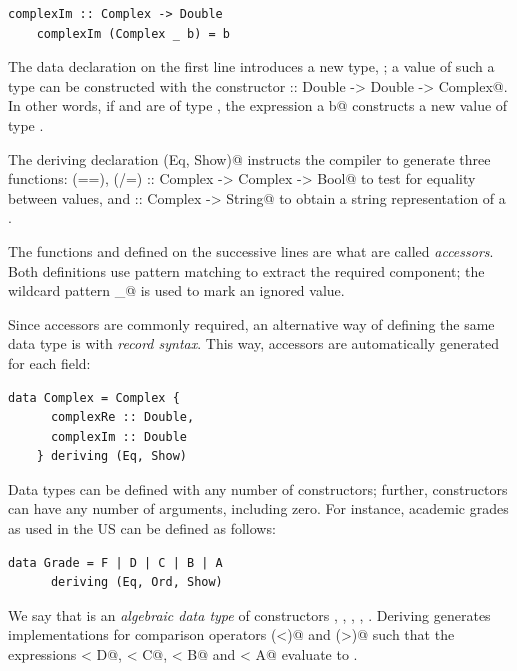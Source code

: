 \documentclass[UdineBachThesis,american,11pt,draft]{PhdThesis}
\begin{document}
  \begin{lstlisting}[gobble=4,basicstyle=\ttfamily\small]
    complexIm :: Complex -> Double
    complexIm (Complex _ b) = b
  \end{lstlisting}

  The data declaration on the first line introduces a new type,
  \lstinline@Complex@; a value of such a type can be constructed with the
  constructor \lstinline@Complex :: Double -> Double -> Complex@. In other
  words, if \lstinline@a@ and \lstinline@b@ are of type \lstinline@Double@, the
  expression \lstinline@Complex a b@ constructs a new value of type
  \lstinline@Complex@.

  The deriving declaration \lstinline@deriving (Eq, Show)@ instructs the
  compiler to generate three functions:
  \lstinline@(==), (/=) :: Complex -> Complex -> Bool@ to test for equality
  between values, and \lstinline@show :: Complex -> String@ to obtain a string
  representation of a \lstinline@Complex@.

  The functions \lstinline@complexRe@ and \lstinline@complexIm@ defined on the
  successive lines are what are called \emph{accessors}. Both definitions use
  pattern matching to extract the required component; the wildcard pattern
  \lstinline@_@ is used to mark an ignored value.

  Since accessors are commonly required, an alternative way of defining the same
  data type is with \emph{record syntax}. This way, accessors are automatically
  generated for each field:

  \begin{lstlisting}[gobble=4,basicstyle=\ttfamily\small]
    data Complex = Complex {
      complexRe :: Double,
      complexIm :: Double
    } deriving (Eq, Show)
  \end{lstlisting}

  Data types can be defined with any number of constructors; further,
  constructors can have any number of arguments, including zero. For instance,
  academic grades as used in the US can be defined as follows:

  \begin{lstlisting}[gobble=4,basicstyle=\ttfamily\small]
    data Grade = F | D | C | B | A
      deriving (Eq, Ord, Show)
  \end{lstlisting}

  We say that \lstinline@Grade@ is an \emph{algebraic data type} of constructors
  \lstinline@F@, \lstinline@D@, \lstinline@C@, \lstinline@B@, \lstinline@A@.
  Deriving \lstinline@Ord@ generates implementations for comparison operators
  \lstinline@(<)@ and \lstinline@(>)@ such that the expressions
  \lstinline@F < D@, \lstinline@D < C@, \lstinline@C < B@ and \lstinline@B < A@
  evaluate to \lstinline@True@.
\end{document}
